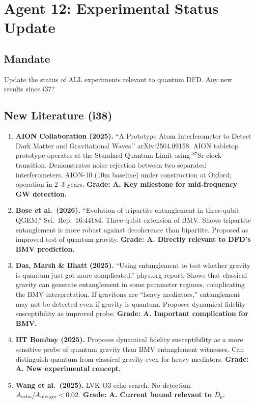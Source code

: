 \documentclass[11pt,a4paper]{article}
\begin{document}
\newpage
\section{Agent 12: Experimental Status Update}
\label{sec:agent12}

\subsection{Mandate}

Update the status of ALL experiments relevant to quantum DFD. Any new results since i37?

\subsection{New Literature (i38)}

\begin{enumerate}
\item \textbf{AION Collaboration (2025).} ``A Prototype Atom Interferometer to Detect Dark Matter and Gravitational Waves.'' arXiv:2504.09158. AION tabletop prototype operates at the Standard Quantum Limit using $^{87}$Sr clock transition. Demonstrates noise rejection between two separated interferometers. AION-10 (10m baseline) under construction at Oxford; operation in 2--3 years. \textbf{Grade: A. Key milestone for mid-frequency GW detection.}

\item \textbf{Bose et al.\ (2026).} ``Evolution of tripartite entanglement in three-qubit QGEM.'' Sci.\ Rep.\ 16:44184. Three-qubit extension of BMV. Shows tripartite entanglement is more robust against decoherence than bipartite. Proposed as improved test of quantum gravity. \textbf{Grade: A. Directly relevant to DFD's BMV prediction.}

\item \textbf{Das, Marsh \& Bhatt (2025).} ``Using entanglement to test whether gravity is quantum just got more complicated.'' phys.org report. Shows that classical gravity can generate entanglement in some parameter regimes, complicating the BMV interpretation. If gravitons are ``heavy mediators,'' entanglement may not be detected even if gravity is quantum. Proposes dynamical fidelity susceptibility as improved probe. \textbf{Grade: A. Important complication for BMV.}

\item \textbf{IIT Bombay (2025).} Proposes dynamical fidelity susceptibility as a more sensitive probe of quantum gravity than BMV entanglement witnesses. Can distinguish quantum from classical gravity even for heavy mediators. \textbf{Grade: A. New experimental concept.}

\item \textbf{Wang et al.\ (2025).} LVK O3 echo search. No detection. $A_{\rm echo}/A_{\rm merger} < 0.02$. \textbf{Grade: A. Current bound relevant to $D_0$.}
\end{enumerate}
\end{document}
